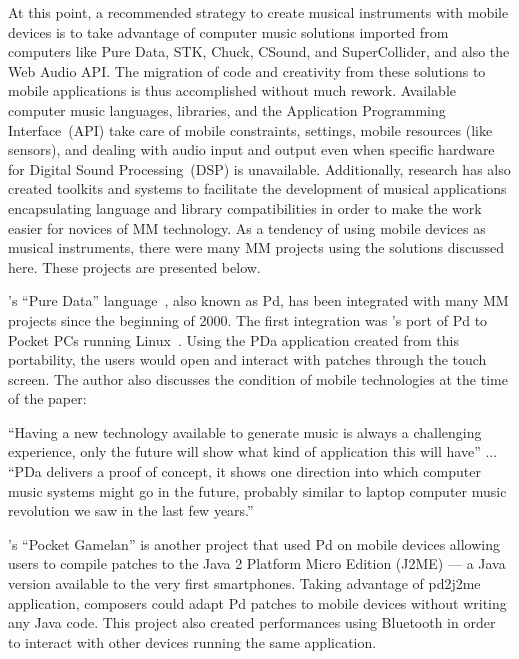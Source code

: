 At this point, a recommended strategy to create musical instruments with mobile devices is to take advantage of computer music solutions imported from computers like Pure Data, STK, Chuck, CSound, and SuperCollider, and also the Web Audio API.
The migration of code and creativity from these solutions to mobile applications is thus accomplished without much rework.
Available computer music languages, libraries, and the Application Programming Interface~(API) take care of mobile constraints, settings, mobile resources (like sensors), and dealing with audio input and output even when specific  hardware for Digital Sound Processing~(DSP) is unavailable.
Additionally, research has also created toolkits and systems to facilitate the development of musical applications encapsulating language and library compatibilities in order to make the work easier for novices of MM technology.
As a tendency of using mobile devices as musical instruments, there were many MM projects using the solutions discussed  here.
These projects are presented below.

's ``Pure Data'' language~\citep{Puckette1997puredata}, also known as Pd, has been integrated with many MM projects since the beginning of 2000.
The first integration was 's port of Pd to Pocket PCs running Linux~\citep{Geiger2003pda}.
Using the PDa application created from this portability, the users would open and interact with patches through the touch screen.
The author also discusses the condition of mobile technologies at the time of the paper:

\begin{adjustwidth}{6 em}{0pt}
	``Having a new technology available to generate music is always a challenging experience, only the future will show what kind of application this will have'' ... ``PDa delivers a proof of concept, it shows one direction into which computer music systems might go in the future, probably similar to laptop computer music revolution we saw in the last few years.'' \cite[p.~4]{Geiger2003pda} 
\end{adjustwidth}

\citeauthor{Schiemer2005pocketgamelan}'s ``Pocket Gamelan'' is another project that used Pd on mobile devices allowing users to compile patches to the Java 2 Platform Micro Edition (J2ME) --- a Java version available to the very first smartphones.
Taking advantage of pd2j2me application, composers could adapt Pd patches to mobile devices without writing any Java code.
This project also created performances using Bluetooth in order to interact with other devices running the same application.

